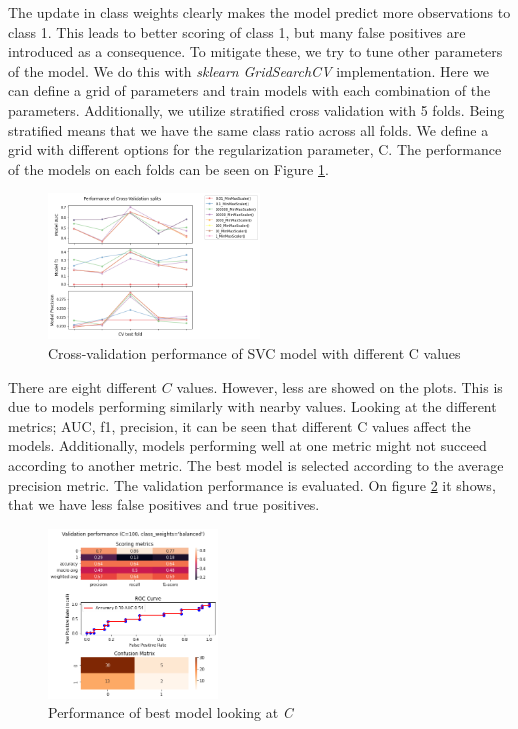 The update in class weights clearly makes the model predict more observations to class 1. This leads to better scoring of class 1, but many false positives are introduced as a consequence. To mitigate these, we try to tune other parameters of the model. We do this with \textit{sklearn} \textit{GridSearchCV} implementation. Here we can define a grid of parameters and train models with each combination of the parameters. Additionally, we utilize stratified cross validation with 5 folds. Being stratified means that we have the same class ratio across all folds. We define a grid with different options for the regularization parameter, C. The performance of the models on each folds can be seen on Figure \ref{fig:results_gridcv_balanced_C}.     

\begin{figure}[H]
  \centering
  \includegraphics[width=0.5\textwidth]{../project/images/results_gridcv_balanced-C.png}
  \caption{Cross-validation performance of SVC model with different C values}
  \label{fig:results_gridcv_balanced_C}
\end{figure}
There are eight different $C$ values. However, less are showed on the plots. This is due to models performing similarly with nearby values. Looking at the different metrics; AUC, f1, precision, it can be seen that different C values affect the models. Additionally, models performing well at one metric might not succeed according to another metric. The best model is selected according to the average precision metric. The validation performance is evaluated. On figure \ref{fig:results_gridcv_balanced_C_metrics} it shows, that we have less false positives and true positives.   
\begin{figure}[H]
  \centering
  \includegraphics[width=0.4\textwidth]{../project/images/results_gridcv_balanced-C_metrics.png}
  \caption{Performance of best model looking at \textit{C}}
  \label{fig:results_gridcv_balanced_C_metrics}
\end{figure}

